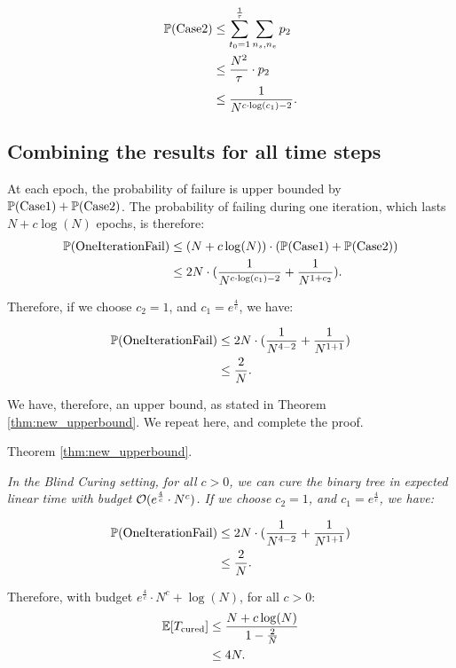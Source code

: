 \begin{align*}
\mathbb{P}(\rm Case 2) &\leq \sum_{t_0 = 1}^{\frac{1}{\tau}} \sum_{n_s, n_e} p_2 \\
&\leq \frac{N^2}{\tau} \cdot p_2 \\
&\leq \frac{1}{N^{c\cdot\log(c_1) - 2}}.
\end{align*}

\subsection{Combining the results for all time steps}
\label{ssec:combining_upperbd}
At each epoch, the probability of failure is upper bounded by $\mathbb{P}(\rm Case 1) + \mathbb{P}(\rm Case 2)$. The probability of failing during one iteration, which lasts $N + c\log(N)$ epochs, is therefore:
\begin{align*}
\mathbb{P}(\rm {\rm OneIteration}Fail) &\leq  (N + c\log(N))\cdot (\mathbb{P}(\rm Case 1)  + \mathbb{P}(\rm Case 2)) \\
&\leq 2N \cdot (\frac{1}{N^{c\cdot\log(c_1) - 2}} + \frac{1}{N^{1+c_2}}).
\end{align*}

Therefore, if we choose $c_2 = 1$, and $c_1 = e^{\frac{4}{c}}$, we have:

\begin{align*}
\mathbb{P}(\rm {\rm OneIteration}Fail) &\leq 2N \cdot (\frac{1}{N^{4 - 2}} + \frac{1}{N^{1+1}}) \\
&\leq  \frac{2}{N}.
\end{align*}


We have, therefore, an upper bound, as stated in Theorem \ref{thm:new_upperbound}. We repeat here, and complete the proof.
\vspace{0.2cm}

\noindent
{\sc Theorem} \ref{thm:new_upperbound}. {\em
	In the Blind Curing setting, for all $c>0$, we can cure the binary tree in expected linear time with budget $\mathcal{O}(e^{\frac{4}{c}}\cdot N^{c} )$.
	\proof If we choose $c_2 = 1$, and $c_1 = e^{\frac{4}{c}}$, we have:
	
	\begin{align*}
	\mathbb{P}(\rm {\rm OneIteration}Fail) &\leq 2N \cdot (\frac{1}{N^{4 - 2}} + \frac{1}{N^{1+1}}) \\
	&\leq  \frac{2}{N}.
	\end{align*}
	
	Therefore, with budget $e^{\frac{4}{c}}\cdot N^{c} + \log(N)$, for all $c>0$:
	\begin{align*}
	\mathbb{E}[T_{{\rm cured}}] &\leq \frac{N + c\log(N)}{1 - \frac{2}{N}} \\
	&\leq 4N.
	\end{align*}
	}
	

